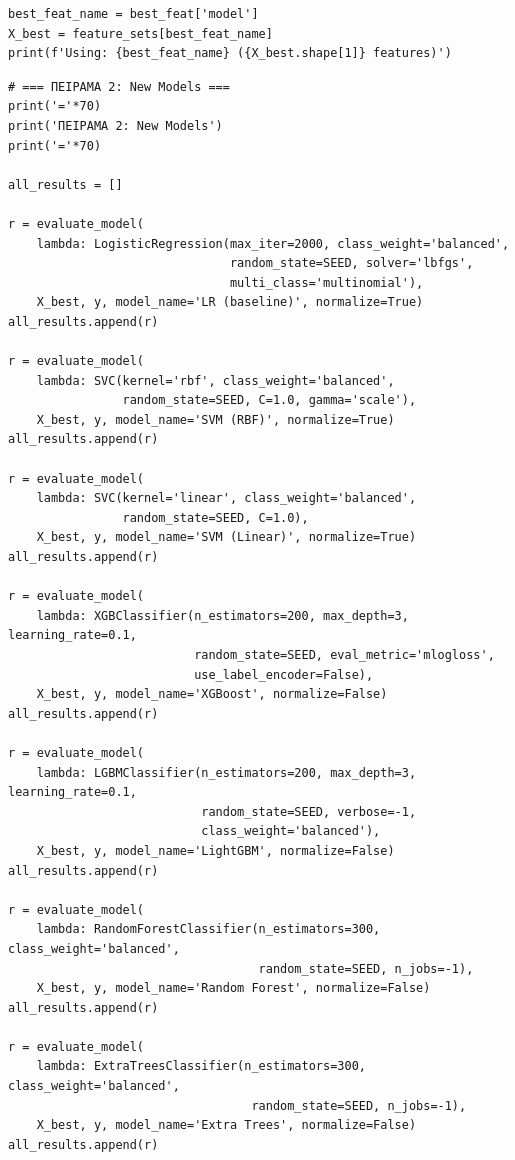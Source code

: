 \begin{lstlisting}
best_feat_name = best_feat['model']
X_best = feature_sets[best_feat_name]
print(f'Using: {best_feat_name} ({X_best.shape[1]} features)')
\end{lstlisting}
 
\begin{lstlisting}
# === ΠΕΙΡΑΜΑ 2: New Models ===
print('='*70)
print('ΠΕΙΡΑΜΑ 2: New Models')
print('='*70)
 
all_results = []
 
r = evaluate_model(
    lambda: LogisticRegression(max_iter=2000, class_weight='balanced',
                               random_state=SEED, solver='lbfgs',
                               multi_class='multinomial'),
    X_best, y, model_name='LR (baseline)', normalize=True)
all_results.append(r)
 
r = evaluate_model(
    lambda: SVC(kernel='rbf', class_weight='balanced',
                random_state=SEED, C=1.0, gamma='scale'),
    X_best, y, model_name='SVM (RBF)', normalize=True)
all_results.append(r)
 
r = evaluate_model(
    lambda: SVC(kernel='linear', class_weight='balanced',
                random_state=SEED, C=1.0),
    X_best, y, model_name='SVM (Linear)', normalize=True)
all_results.append(r)
 
r = evaluate_model(
    lambda: XGBClassifier(n_estimators=200, max_depth=3, learning_rate=0.1,
                          random_state=SEED, eval_metric='mlogloss',
                          use_label_encoder=False),
    X_best, y, model_name='XGBoost', normalize=False)
all_results.append(r)
 
r = evaluate_model(
    lambda: LGBMClassifier(n_estimators=200, max_depth=3, learning_rate=0.1,
                           random_state=SEED, verbose=-1,
                           class_weight='balanced'),
    X_best, y, model_name='LightGBM', normalize=False)
all_results.append(r)
 
r = evaluate_model(
    lambda: RandomForestClassifier(n_estimators=300, class_weight='balanced',
                                   random_state=SEED, n_jobs=-1),
    X_best, y, model_name='Random Forest', normalize=False)
all_results.append(r)
 
r = evaluate_model(
    lambda: ExtraTreesClassifier(n_estimators=300, class_weight='balanced',
                                  random_state=SEED, n_jobs=-1),
    X_best, y, model_name='Extra Trees', normalize=False)
all_results.append(r)
\end{lstlisting}
 
